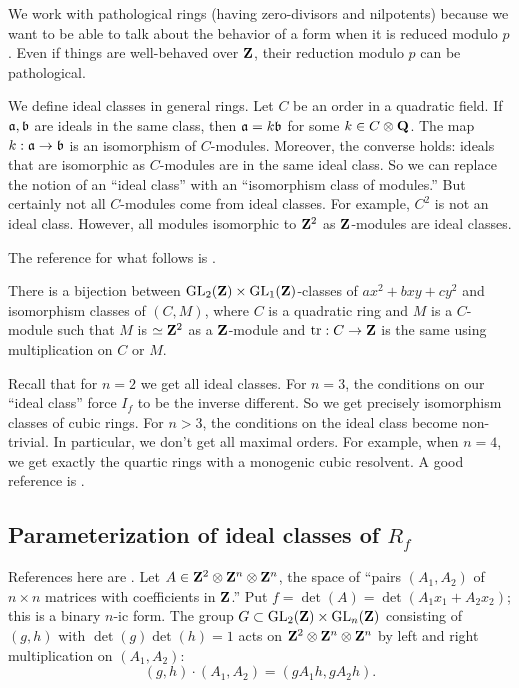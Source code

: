 We work with pathological rings (having zero-divisors and nilpotents) because 
we want to be able to talk about the behavior of a form when it is reduced 
modulo $p$. Even if things are well-behaved over $\mathbf{Z}$, their reduction modulo 
$p$ can be pathological. 

We define ideal classes in general rings. Let $C$ be an order in a quadratic 
field. If $\mathfrak{a},\mathfrak{b}$ are ideals in the same class, then $\mathfrak{a}= k \mathfrak{b}$ for some 
$k\in C\otimes \mathbf{Q}$. The map $k:\mathfrak{a} \to \mathfrak{b}$ is an isomorphism of $C$-modules. 
Moreover, the converse holds: ideals that are isomorphic as $C$-modules are in 
the same ideal class. So we can replace the notion of an ``ideal class'' with 
an ``isomorphism class of modules.'' But certainly not all $C$-modules come 
from ideal classes. For example, $C^2$ is not an ideal class. However, all 
modules isomorphic to $\mathbf{Z}^2$ as $\mathbf{Z}$-modules are ideal classes. 

The reference for what follows is \cite{w11-gauss}. 

\begin{theo}
There is a bijection between 
$\operatorname{GL}_2(\mathbf{Z})\times \operatorname{GL}_1(\mathbf{Z})$-classes of 
$a x^2 + b x y+c y^2$ and isomorphism classes of $(C,M)$, where $C$ is a 
quadratic ring and $M$ is a $C$-module such that $M$ is $\simeq \mathbf{Z}^2$ as a 
$\mathbf{Z}$-module and $\operatorname{tr}:C\to \mathbf{Z}$ is the same using multiplication on $C$ or 
$M$. 
\end{theo}

Recall that for $n=2$ we get all ideal classes. For $n=3$, the conditions 
on our ``ideal class'' force $I_f$ to be the inverse different. So we get 
precisely isomorphism classes of cubic rings. For $n>3$, the conditions on 
the ideal class become non-trivial. In particular, we don't get all maximal 
orders. For example, when $n=4$, we get exactly the quartic rings with a 
monogenic cubic resolvent. A good reference is \cite{w12}. 





\subsection{Parameterization of ideal classes of \texorpdfstring{$R_f$}{Rf}}

References here are \cite{b04-i,b04-ii,w14}. Let 
$A\in \mathbf{Z}^2\otimes \mathbf{Z}^n\otimes \mathbf{Z}^n$, the space of ``pairs $(A_1,A_2)$ of 
$n\times n$ matrices with coefficients in $\mathbf{Z}$.'' Put 
$f=\det(A)=\det(A_1 x_1 + A_2 x_2)$; this is a binary $n$-ic form. The group 
$G\subset \operatorname{GL}_2(\mathbf{Z}) \times\operatorname{GL}_n(\mathbf{Z})$ consisting of 
$(g,h)$ with $\det(g)\det(h)=1$ acts on $\mathbf{Z}^2\otimes \mathbf{Z}^n\otimes \mathbf{Z}^n$ by 
left and right multiplication on $(A_1,A_2)$: 
\[
  (g,h)\cdot (A_1,A_2) = (g A_1 h,g A_2 h) .
\]

